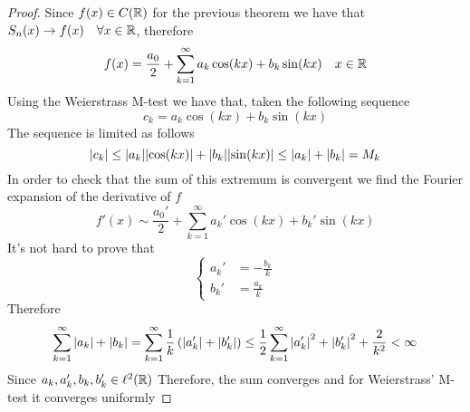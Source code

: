 \documentclass[../complete.tex]{subfiles}
\begin{document}
\begin{proof}
	Since $f(x)\in C(\mathbb{R})$ for the previous theorem we have that $S_n(x)\to f(x)\quad\forall x\in\mathbb{R}$, therefore
	\begin{equation*}
		f(x)=\frac{a_0}{2}+\sum_{k=1}^{\infty}a_k\cos(kx)+b_k\sin(kx)\quad x\in\mathbb{R}
	\end{equation*}
	Using the Weierstrass M-test we have that, taken the following sequence
	\begin{equation*}
		c_k=a_k\cos(kx)+b_k\sin(kx)
	\end{equation*}
	The sequence is limited as follows
	\begin{equation*}
		\abs{c_k}\le\abs{a_k}\abs{\cos(kx)}+\abs{b_k}\abs{\sin(kx)}\le\abs{a_k}+\abs{b_k}=M_k
	\end{equation*}
	In order to check that the sum of this extremum is convergent we find the Fourier expansion of the derivative of $f$
	\begin{equation*}
		f'(x)\sim\frac{a_0'}{2}+\sum_{k=1}^{\infty}a_k'\cos(kx)+b_k'\sin(kx)
	\end{equation*}
	It's not hard to prove that
	\begin{equation*}
		\left\{ \begin{aligned}
				a_k'&=-\frac{b_k}{k}\\
				b_k'&=\frac{a_k}{k}
		\end{aligned}\right.
	\end{equation*}
	Therefore
	\begin{equation*}
		\sum_{k=1}^{\infty}\abs{a_k}+\abs{b_k}=\sum_{k=1}^{\infty}\frac{1}{k}\left( \abs{a_k'}+\abs{b_k'} \right)\le\frac{1}{2}\sum_{k=1}^{\infty}\abs{a_k'}^2+\abs{b_k'}^2+\frac{2}{k^2}<\infty
	\end{equation*}
	Since $a_k,a_k',b_k,b_k'\in\ell^2(\mathbb{R})$
	Therefore, the sum converges and for Weierstrass' M-test it converges uniformly
\end{proof}
\end{document}
